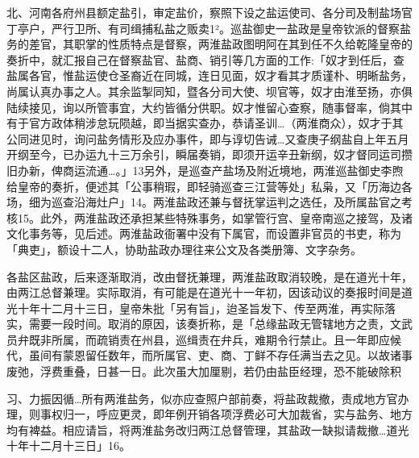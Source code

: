 \noindent 北、河南各府州县额定盐引，审定盐价，察照下设之盐运使司、各分司及制盐场官丁亭户，严行卫所、有司缉捕私盐之贩卖1²。巡盐御史一盐政是皇帝钦派的督察盐务的差官，其职掌的性质特点是督察，两淮盐政图明阿在其到任不久给乾隆皇帝的奏折中，就汇报自己在督察盐官、盐商、销引等几方面的工作:「奴才到任后，查盐属各官，惟盐运使仓圣裔近在同城，连日见面，奴才看其才质谨朴、明晰盐务，尚属认真办事之人。其余监掣同知，暨各分司大使、坝官等，奴才由淮至扬，亦俱陆续接见，询以所管事宜，大约皆循分供职。奴才惟留心查察，随事督率，倘其中有于官方政体稍涉怠玩陨越，即当据实查办，恭请圣训…（两淮商众），奴才于其公同进见时，询问盐务情形及应办事件，即与谆切告诫…又查庚子纲盐自上年五月开纲至今，已办运九十三万余引，瞬届奏销，即须开运辛丑新纲，奴才督同运司攒旧办新，俾商运流通…。」13另外，是巡查产盐场及附近境地，两淮巡盐御史李煦给皇帝的奏折，便述其「公事稍瑕，即轻骑巡查三江营等处」私枭，又「历海边各场，细为巡查沿海灶户」14。两淮盐政还兼与督抚掌运判之选任，及所属盐官之考核15。此外，两淮盐政还承担某些特殊事务，如掌管行宫、皇帝南巡之接驾，及诸文化事务等，见后述。两淮盐政衙署中没有下属官，而设置非官员的书吏，称为「典吏」，额设十二人，协助盐政办理往来公文及各类册簿、文字杂务。

各盐区盐政，后来逐渐取消，改由督抚兼理，两淮盐政取消较晚，是在道光十年，由两江总督兼理。实际取消，有可能是在道光十一年初，因该动议的奏报时间是道光十年十二月十三日，皇帝朱批「另有旨」，迨圣旨发下、传至两淮，再实际落实，需要一段时间。取消的原因，该奏折称，是「总缘盐政无管辖地方之责，文武员弁既非所属，而疏销责在州县，巡缉责在弁兵，难期令行禁止。且一年即应候代，虽间有蒙恩留任数年，而所属官、吏、商、丁鲜不存任满当去之见。以故诸事废弛，浮费重叠，日甚一日。此次虽大加厘剔，若仍由盐臣经理，恐不能破除积

\vfill
\begin{BookNotes}
\end{BookNotes}

\noindent 习、力振因循…所有两淮盐务，似亦应查照户部前奏，将盐政裁撤，责成地方官办理，则事权归一，呼应更灵，即年例开销各项浮费必可大加裁省，实与盐务、地方均有裨益。相应请旨，将两淮盐务改归两江总督管理，其盐政一缺拟请裁撤…道光十年十二月十三日」16。

